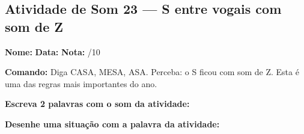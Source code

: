 \subsection{Atividade de Som 23 --- S entre vogais com som de Z}
\begin{exercicio}



\noindent\textbf{Nome:} \underline{\hspace{3.2cm}} \quad \textbf{Data:} \underline{\hspace{1.6cm}} \quad \textbf{Nota:} \underline{\hspace{0.9cm}}/10


\noindent\textbf{Comando:} Diga CASA, MESA, ASA. Perceba: o S ficou com som de Z. Esta é uma das regras mais importantes do ano.


\begin{center}
\end{center}

\noindent\textbf{Escreva 2 palavras com o som da atividade:}

\begin{center}
  \underline{\hspace{3cm}} \quad \underline{\hspace{3cm}}
\end{center}

\noindent\textbf{Desenhe uma situação com a palavra da atividade:}

\begin{center}
\end{center}

\end{exercicio}



